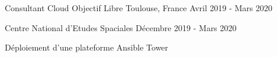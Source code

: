

\begin{cventries}

  \cventry
    {Consultant Cloud} %
    {Objectif Libre} %
    {Toulouse, France} %
    {Avril 2019 - Mars 2020} %
    {
      \begin{cvsubentries}
        \cvsubentry
          {}
          {Centre National d'Etudes Spaciales}
          {Décembre 2019 - Mars 2020}
          {
            \begin{cvitems} %
              \item {Déploiement d'une plateforme Ansible Tower}
            \end{cvitems}
          }
      \end{cvsubentries}
    }


\end{cventries}
